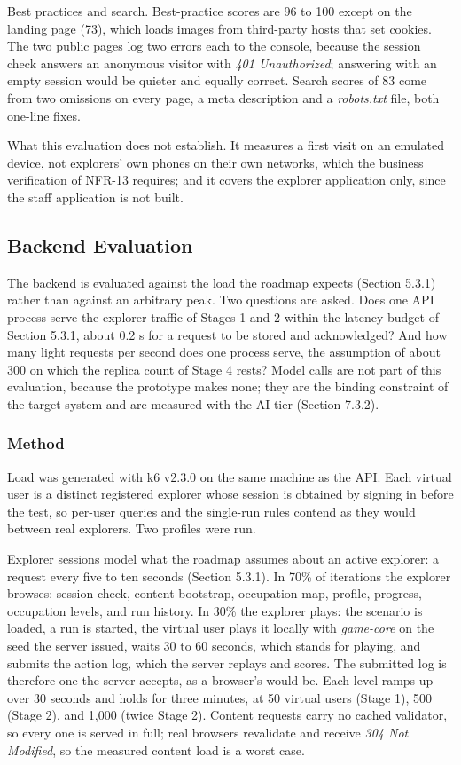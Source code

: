 Best practices and search. Best-\allowbreak{}practice scores are 96 to 100 except on the landing page (73), which loads images from third-party hosts that set cookies. The two public pages log two errors each to the console, because the session check answers an anonymous visitor with \textit{401 Unauthorized}; answering with an empty session would be quieter and equally correct. Search scores of 83 come from two omissions on every page, a meta description and a \textit{robots.\allowbreak{}txt} file, both one-line fixes.

What this evaluation does not establish. It measures a first visit on an emulated device, not explorers' own phones on their own networks, which the business verification of NFR-13 requires; and it covers the explorer application only, since the staff application is not built.

\subsection{Backend Evaluation}

The backend is evaluated against the load the roadmap expects (Section 5.3.1) rather than against an arbitrary peak. Two questions are asked. Does one API process serve the explorer traffic of Stages 1 and 2 within the latency budget of Section 5.3.1, about 0.2 s for a request to be stored and acknowledged? And how many light requests per second does one process serve, the assumption of about 300 on which the replica count of Stage 4 rests? Model calls are not part of this evaluation, because the prototype makes none; they are the binding constraint of the target system and are measured with the AI tier (Section 7.3.2).

\subsubsection{Method}

Load was generated with k6 v2.3.0 on the same machine as the API. Each virtual user is a distinct registered explorer whose session is obtained by signing in before the test, so per-user queries and the single-run rules contend as they would between real explorers. Two profiles were run.

Explorer sessions model what the roadmap assumes about an active explorer: a request every five to ten seconds (Section 5.3.1). In 70\% of iterations the explorer browses: session check, content bootstrap, occupation map, profile, progress, occupation levels, and run history. In 30\% the explorer plays: the scenario is loaded, a run is started, the virtual user plays it locally with \textit{game-core} on the seed the server issued, waits 30 to 60 seconds, which stands for playing, and submits the action log, which the server replays and scores. The submitted log is therefore one the server accepts, as a browser's would be. Each level ramps up over 30 seconds and holds for three minutes, at 50 virtual users (Stage 1), 500 (Stage 2), and 1,000 (twice Stage 2). Content requests carry no cached validator, so every one is served in full; real browsers revalidate and receive \textit{304 Not Modified}, so the measured content load is a worst case.

